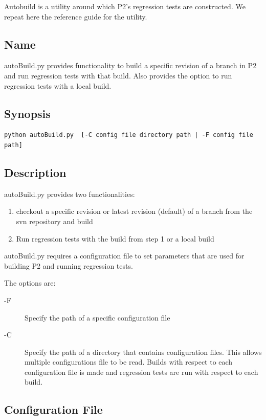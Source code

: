 \documentclass{article}
\begin{document}
Autobuild is a utility around which P2's regression tests are
constructed. We repeat here the reference guide for the utility.

\subsection{Name}

autoBuild.py provides functionality to build a specific revision of a
branch in P2 and run regression tests with that build. Also provides the
option to run regression tests with a local build.


\subsection{Synopsis}

\begin{verbatim}
python autoBuild.py  [-C config file directory path | -F config file path]
\end{verbatim}


\subsection{Description}

autoBuild.py provides two functionalities:

\begin{enumerate}
\item checkout a specific revision or latest revision (default) of a
branch from the svn repository and build
\item Run regression tests with the build from step 1 or a local build
\end{enumerate}

autoBuild.py requires a configuration file to set parameters that are
used for building P2 and running regression tests.

The options are:
\begin{description}
\item[-F] Specify the path of a specific configuration file
\item[-C] Specify the path of a directory that contains configuration
files. This allows multiple configurations file to be read. Builds with
respect to each configuration file is made and regression tests are run
with respect to each build.
\end{description}

\subsection{Configuration File}
\end{document}
